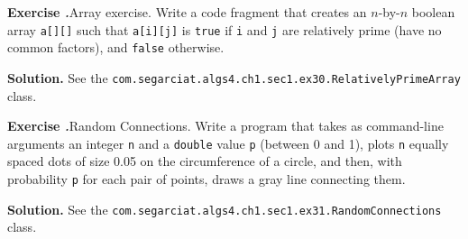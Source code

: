 \documentclass[12pt, a4paper]{article}
\newenvironment{ex}[2][Exercise]
{\par\medskip\noindent \textbf{#1 #2.}}
{\medskip}
\newenvironment{sol}[1][Solution]
{\par\medskip\noindent \textbf{#1.} }
{\medskip}
\begin{document}
	\begin{ex}{30}
		\emph{Array exercise}. Write a code fragment that creates an $n$-by-$n$ boolean
		array \texttt{a[][]} such that \texttt{a[i][j]} is \texttt{true} if \texttt{i}
		and \texttt{j} are relatively prime (have no common factors), and \texttt{false}
		otherwise.
	\end{ex}
	\begin{sol}
		See the \texttt{com.segarciat.algs4.ch1.sec1.ex30.RelativelyPrimeArray} class.
	\end{sol}
	\begin{ex}{31}
		\emph{Random Connections}. Write a program that takes as command-line arguments
		an integer \texttt{n} and a \texttt{double} value \texttt{p} (between 0 and 1),
		plots \texttt{n} equally spaced dots of size 0.05 on the circumference of a circle,
		and then, with probability \texttt{p} for each pair of points, draws a gray line
		connecting them.
	\end{ex}
	\begin{sol}
		See the \texttt{com.segarciat.algs4.ch1.sec1.ex31.RandomConnections} class.
	\end{sol}
	\pagebreak
	\printbibliography
\end{document}
